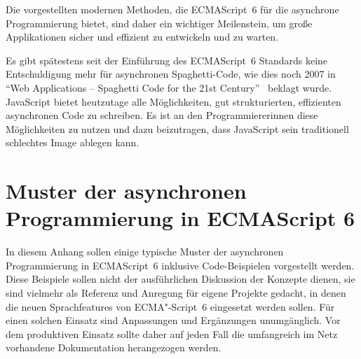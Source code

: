 \documentclass[
11pt, %
a4paper, %
oneside, %
pdfspacing, %
headinclude,
BCOR5mm, %
ngerman, %
bibtotocnumbered,
]{scrartcl}
\begin{document}
		Die vorgestellten modernen Methoden, die ECMAScript~6 für die asynchrone Programmierung bietet, sind daher ein wichtiger Meilenstein, um große Applikationen sicher und effizient zu entwickeln und zu warten.
		
		Es gibt spätestens seit der Einführung des ECMAScript~6 Standards keine Entschuldigung mehr für asynchronen Spaghetti-Code, wie dies noch 2007 in "`Web Applications -- Spaghetti Code for the 21st Century"'~\citep{Mikkonen.2007} beklagt wurde. JavaScript bietet heutzutage alle Möglichkeiten, gut strukturierten, effizienten asynchronen Code zu schreiben. Es ist an den Programmiererinnen diese Möglichkeiten zu nutzen und dazu beizutragen, dass JavaScript sein traditionell schlechtes Image ablegen kann. 


\cleardoublepage

\renewcommand{\refname}{\spacedlowsmallcaps{References}} %

\renewcommand{\refname}{Literatur} 





\cleardoublepage

\appendix

\newcommand{\appendixpagenumbering}{
	\break
	\renewcommand{\thepage}{\thesection-\arabic{page}}
}

\appendixpagenumbering


\section{Muster der asynchronen Programmierung in ECMAScript 6}

	In diesem Anhang sollen einige typische Muster der asynchronen Programmierung in ECMAScript~6 inklusive Code-Beispielen vorgestellt werden. Diese Beispiele sollen nicht der ausführlichen Diskussion der Konzepte dienen, sie sind vielmehr als Referenz und Anregung für eigene Projekte gedacht, in denen die neuen Sprachfeatures von ECMA"-Script~6 eingesetzt werden sollen. Für einen solchen Einsatz sind Anpassungen und Ergänzungen unumgänglich. Vor dem produktiven Einsatz sollte daher auf jeden Fall die umfangreich im Netz vorhandene Dokumentation herangezogen werden. 
	
\end{document}
